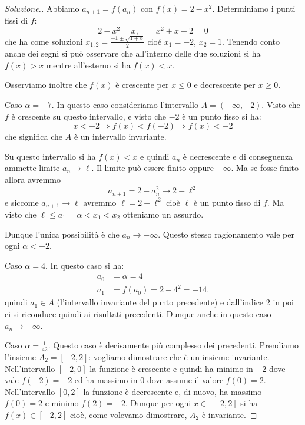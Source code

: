 \begin{proof}[Soluzione.]
  Abbiamo $a_{n+1} = f(a_n)$ con $f(x) = 2-x^2$. Determiniamo i punti
  fissi di $f$:
  \[
  2-x^2 = x, \qquad x^2 + x - 2 = 0
  \]
  che ha come soluzioni $x_{1,2} = \frac{-1\pm\sqrt{1+8}}{2}$ cioé
  $x_1 = -2$, $x_2 = 1$. Tenendo conto anche dei segni si può
  osservare che all'interno delle due soluzioni si ha $f(x)>x$ mentre
  all'esterno si ha $f(x)<x$.

  Osserviamo inoltre che $f(x)$ è crescente per
  $x\le 0$ e decrescente per $x\ge 0$.

  Caso $\alpha=-7$. In questo caso consideriamo l'intervallo
  $A=(-\infty, -2)$. Visto che $f$ è crescente su questo intervallo,
  e visto che $-2$ è un punto fisso si ha:
  \[
  x < -2 \Rightarrow f(x) < f(-2) \Rightarrow f(x) < -2
  \]
  che significa che $A$ è un intervallo invariante.

  Su questo intervallo si ha $f(x)<x$ e quindi $a_n$ è decrescente e
  di conseguenza ammette limite $a_n\to \ell$. Il limite può essere
  finito oppure $-\infty$. Ma se fosse finito allora avremmo
  \[
  a_{n+1} = 2 - a_n^2 \to 2 - \ell^2
  \]
  e siccome $a_{n+1}\to \ell$ avremmo $\ell = 2 - \ell^2$ cioè $\ell$
  è un punto fisso di $f$. Ma visto che $\ell \le a_1 = \alpha < x_1 <
  x_2$ otteniamo un assurdo.

  Dunque l'unica possibilità è che $a_n \to -\infty$. Questo
  stesso ragionamento vale per ogni $\alpha<-2$.

  Caso $\alpha=4$. In questo caso si ha:
  \begin{align*}
    a_0 &= \alpha = 4\\
    a_1 &= f(a_0) = 2 - 4^2 = -14.
  \end{align*}
  quindi $a_1 \in A$ (l'intervallo invariante del punto precedente) e
  dall'indice $2$ in poi ci si riconduce quindi ai risultati
  precedenti. Dunque anche in questo caso $a_n \to -\infty$.

  Caso $\alpha = \frac 1{42}$. Questo caso è decisamente più complesso dei
  precedenti. Prendiamo l'insieme $A_2 = [-2, 2]$: vogliamo dimostrare
  che è un insieme invariante. Nell'intervallo $[-2,0]$ la funzione è
  crescente e quindi ha minimo in $-2$ dove vale $f(-2)=-2$ ed ha
  massimo in $0$ dove assume il valore $f(0) = 2$. Nell'intervallo
  $[0,2]$ la funzione è decrescente e, di nuovo, ha massimo $f(0)=2$ e
  minimo $f(2)=-2$. Dunque per ogni $x\in [-2,2]$ si ha $f(x) \in
  [-2,2]$ cioè, come volevamo dimostrare, $A_2$ è invariante.


\end{proof}
